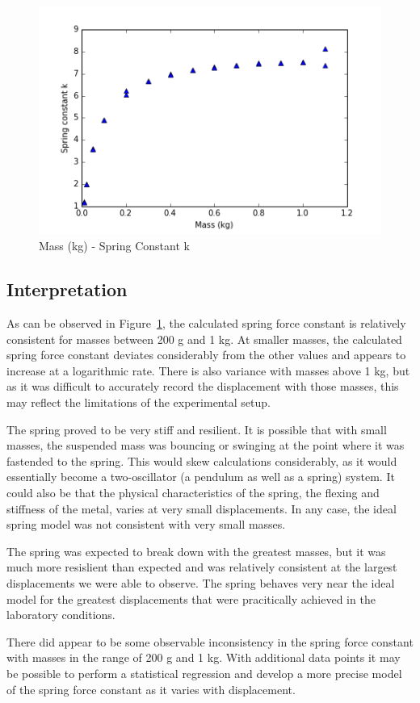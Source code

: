 \documentclass{article}
\numberwithin{figure}{section}
\numberwithin{table}{section}
\begin{document}
\begin{figure}[!hbp]
    \centering
    \includegraphics[width=\textwidth]{data/mass-v-k.png}
    \caption{Mass (kg) - Spring Constant k} 
    \label{mkplot}
\end{figure} 

\FloatBarrier 

\subsection{Interpretation} 

As can be observed in Figure~\ref{mkplot}, the calculated spring force constant is relatively consistent for masses between 200 g and 1 kg.  At smaller masses, the calculated spring force constant deviates considerably from the other values and appears to increase at a logarithmic rate.  There is also variance with masses above 1 kg, but as it was difficult to accurately record the displacement with those masses, this may reflect the limitations of the experimental setup.

The spring proved to be very stiff and resilient.  It is possible that with small masses, the suspended mass was bouncing or swinging at the point where it was fastended to the spring.  This would skew calculations considerably, as it would essentially become a two-oscillator (a pendulum as well as a spring) system.  It could also be that the physical characteristics of the spring, the flexing and stiffness of the metal, varies at very small displacements.  In any case, the ideal spring model was not consistent with very small masses.

The spring was expected to break down with the greatest masses, but it was much more resislient than expected and was relatively consistent at the largest displacements we were able to observe.  The spring behaves very near the ideal model for the greatest displacements that were pracitically achieved in the laboratory conditions.

There did appear to be some observable inconsistency in the spring force constant with masses in the range of 200 g and 1 kg.  With additional data points it may be possible to perform a statistical regression and develop a more precise model of the spring force constant as it varies with displacement.
\end{document}
